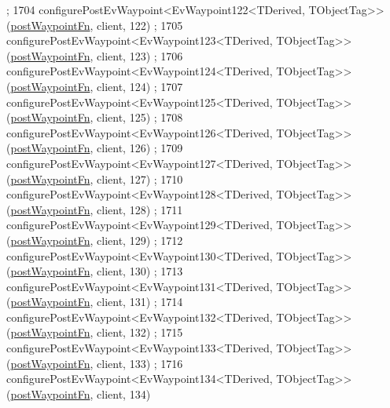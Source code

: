 \begin{DoxyCode}
      ;
1704     configurePostEvWaypoint<EvWaypoint122<TDerived, TObjectTag>>(\hyperlink{classcl__move__base__z_1_1WaypointEventDispatcher_a964a57fcce5d48ec60243230722d8dd7}{postWaypointFn}, client, 122)
      ;
1705     configurePostEvWaypoint<EvWaypoint123<TDerived, TObjectTag>>(\hyperlink{classcl__move__base__z_1_1WaypointEventDispatcher_a964a57fcce5d48ec60243230722d8dd7}{postWaypointFn}, client, 123)
      ;
1706     configurePostEvWaypoint<EvWaypoint124<TDerived, TObjectTag>>(\hyperlink{classcl__move__base__z_1_1WaypointEventDispatcher_a964a57fcce5d48ec60243230722d8dd7}{postWaypointFn}, client, 124)
      ;
1707     configurePostEvWaypoint<EvWaypoint125<TDerived, TObjectTag>>(\hyperlink{classcl__move__base__z_1_1WaypointEventDispatcher_a964a57fcce5d48ec60243230722d8dd7}{postWaypointFn}, client, 125)
      ;
1708     configurePostEvWaypoint<EvWaypoint126<TDerived, TObjectTag>>(\hyperlink{classcl__move__base__z_1_1WaypointEventDispatcher_a964a57fcce5d48ec60243230722d8dd7}{postWaypointFn}, client, 126)
      ;
1709     configurePostEvWaypoint<EvWaypoint127<TDerived, TObjectTag>>(\hyperlink{classcl__move__base__z_1_1WaypointEventDispatcher_a964a57fcce5d48ec60243230722d8dd7}{postWaypointFn}, client, 127)
      ;
1710     configurePostEvWaypoint<EvWaypoint128<TDerived, TObjectTag>>(\hyperlink{classcl__move__base__z_1_1WaypointEventDispatcher_a964a57fcce5d48ec60243230722d8dd7}{postWaypointFn}, client, 128)
      ;
1711     configurePostEvWaypoint<EvWaypoint129<TDerived, TObjectTag>>(\hyperlink{classcl__move__base__z_1_1WaypointEventDispatcher_a964a57fcce5d48ec60243230722d8dd7}{postWaypointFn}, client, 129)
      ;
1712     configurePostEvWaypoint<EvWaypoint130<TDerived, TObjectTag>>(\hyperlink{classcl__move__base__z_1_1WaypointEventDispatcher_a964a57fcce5d48ec60243230722d8dd7}{postWaypointFn}, client, 130)
      ;
1713     configurePostEvWaypoint<EvWaypoint131<TDerived, TObjectTag>>(\hyperlink{classcl__move__base__z_1_1WaypointEventDispatcher_a964a57fcce5d48ec60243230722d8dd7}{postWaypointFn}, client, 131)
      ;
1714     configurePostEvWaypoint<EvWaypoint132<TDerived, TObjectTag>>(\hyperlink{classcl__move__base__z_1_1WaypointEventDispatcher_a964a57fcce5d48ec60243230722d8dd7}{postWaypointFn}, client, 132)
      ;
1715     configurePostEvWaypoint<EvWaypoint133<TDerived, TObjectTag>>(\hyperlink{classcl__move__base__z_1_1WaypointEventDispatcher_a964a57fcce5d48ec60243230722d8dd7}{postWaypointFn}, client, 133)
      ;
1716     configurePostEvWaypoint<EvWaypoint134<TDerived, TObjectTag>>(\hyperlink{classcl__move__base__z_1_1WaypointEventDispatcher_a964a57fcce5d48ec60243230722d8dd7}{postWaypointFn}, client, 134)

\end{DoxyCode}

